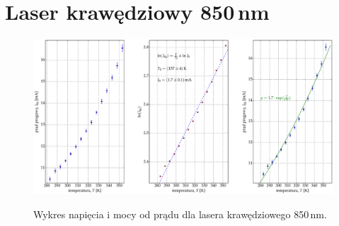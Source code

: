 \section{Laser krawędziowy 850\,nm}
\begin{figure}
\center
  \includegraphics[scale=0.30]{plot_edge_850/plot_fit.eps}
  \label{rys1}
  \caption{Wykres napięcia i mocy od prądu dla lasera krawędziowego 850\,nm.}
\end{figure}